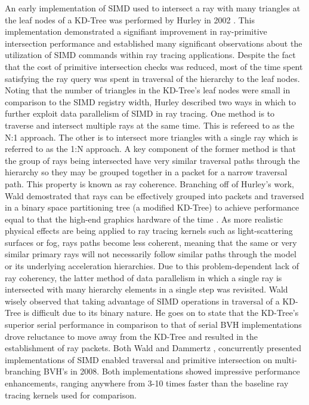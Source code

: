 \documentclass[12pt, a4paper]{article}
\begin{document}
An early implementation of SIMD used to intersect a ray with many triangles at the leaf nodes of a KD-Tree was performed by Hurley in 2002 \cite{Hurley_2002}. This implementation demonstrated a signifiant improvement in ray-primitive intersection performance and established many significant observations about the utilization of SIMD commands within ray tracing applications. Despite the fact that the cost of primitive intersection checks was reduced, most of the time spent satisfying the ray query was spent in traversal of the hierarchy to the leaf nodes. Noting that the number of triangles in the KD-Tree's leaf nodes were small in comparison to the SIMD registry width, Hurley described two ways in which to further exploit data parallelism of SIMD in ray tracing. One method is to traverse and intersect multiple rays at the same time. This is refereed to as the N:1 approach. The other is to intersect more triangles with a single ray which is referred to as the 1:N approach. A key component of the former method is that the group of rays being intersected have very similar traversal paths through the hierarchy so they may be grouped together in a packet for a narrow traversal path. This property is known as ray coherence. Branching off of Hurley's work, Wald demostrated that rays can be effectively grouped into packets and traversed in a binary space partitioning tree (a modified KD-Tree) to achieve performance equal to that the high-end graphics hardware of the time \cite{Wald_2001}. As more realistic physical effects are being applied to ray tracing kernels such as light-scattering surfaces or fog, rays paths become less coherent, meaning that the same or very similar primary rays will not necessarily follow similar paths through the model or its underlying acceleration hierarchies. Due to this problem-dependent lack of ray coherency, the latter method of data parallelism in which a single ray is intersected with many hierarchy elements in a single step was revisited. Wald wisely observed that taking advantage of SIMD operations in traversal of a KD-Tree is difficult due to its binary nature. He goes on to state that the KD-Tree's superior serial performance in comparison to that of serial BVH implementations drove reluctance to move away from the KD-Tree and resulted in the establishment of ray packets. \cite{Wald_2008} Both Wald and Dammertz \cite{Dammertz_2008}, concurrently presented implementations of SIMD enabled traversal and primitive intersection on multi-branching BVH's in 2008. Both implementations showed impressive performance enhancements, ranging anywhere from 3-10 times faster than the baseline ray tracing kernels used for comparison.
\end{document}
